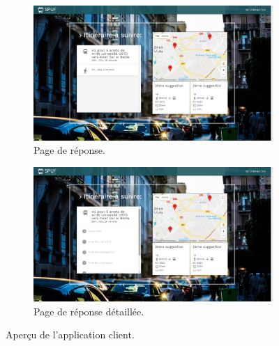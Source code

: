 \begin{figure}
	 \begin{subfigure}[b]{\linewidth}
	 	\includegraphics[width=\linewidth]{img/spuf/response.png}
	 	\caption{Page de réponse.}
	 \end{subfigure}
	 
	 \begin{subfigure}[b]{\linewidth}
	 	\includegraphics[width=\linewidth]{img/spuf/response2.png}
	 	\caption{Page de réponse détaillée.}	 
	 \end{subfigure}
	 \caption{Aperçu de l'application client.}
\end{figure}